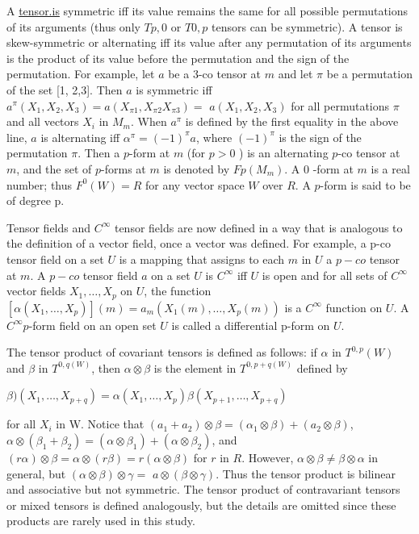 \documentclass[10pt]{article}
\begin{document}
A \href{http://tensor.is}{tensor.is} symmetric iff its value remains the same for all possible permutations of its arguments (thus only $T p, 0$ or $T 0, p$ tensors can be symmetric). A tensor is skew-symmetric or alternating iff its value after any permutation of its arguments is the product of its value before the permutation and the sign of the permutation. For example, let $a$ be a 3-co tensor at $m$ and let $\pi$ be a permutation of the set [1, 2,3]. Then $a$ is symmetric iff $a^{\pi}\left(X_{1}, X_{2}, X_{3}\right)=a\left(X_{\pi 1}, X_{\pi 2} X_{\pi 3}\right)=$ $a\left(X_{1}, X_{2}, X_{3}\right)$ for all permutations $\pi$ and all vectors $X_{i}$ in $M_{m}$. When $a^{\pi}$ is defined by the first equality in the above line, $a$ is alternating iff $\alpha^{\pi}=(-1)^{\pi} a$, where $(-1)^{\pi}$ is the sign of the permutation $\pi .$ Then a $p$-form at $m$ (for $p>0$ ) is an alternating $p$-co tensor at $m$, and the set of $p$-forms at $m$ is denoted by $F p\left(M_{m}\right)$. A 0 -form at $m$ is a real number; thus $F^{0}(W)=R$ for any vector space $W$ over $R$. A $p$-form is said to be of degree p.

Tensor fields and $C^{\infty}$ tensor fields are now defined in a way that is analogous to the definition of a vector field, once a vector was defined. For example, a p-co tensor field on a set $U$ is a mapping that assigns to each $m$ in $U$ a $p-c o$ tensor at $m .$ A $p-c o$ tensor field $a$ on a set $U$ is $C^{\infty}$ iff $U$ is open and for all sets of $C^{\infty}$ vector fields $X_{1}, \ldots, X_{p}$ on $U$, the function $\left[\alpha\left(X_{1}, \ldots, X_{p}\right)\right](m)=a_{m}\left(X_{1}(m), \ldots, X_{p}(m)\right)$ is a $C^{\infty}$ function on $U .$ A $C^{\infty} p$-form field on an open set $U$ is called a differential p-form on $U .$

The tensor product of covariant tensors is defined as follows: if $\alpha$ in $T^{0, p}(W)$ and $\beta$ in $T^{0, q(W)}$, then $\alpha \otimes \beta$ is the element in $T^{0, p+q(W)}$ defined by

$\beta)\left(X_{1}, \ldots, X_{p+q}\right)=\alpha\left(X_{1}, \ldots, X_{p}\right) \beta\left(X_{p+1}, \ldots, X_{p+q}\right)$

for all $X_{i}$ in W. Notice that $\left(a_{1}+a_{2}\right) \otimes \beta=\left(\alpha_{1} \otimes \beta\right)+\left(a_{2} \otimes \beta\right)$, $\alpha \otimes\left(\beta_{1}+\beta_{2}\right)=\left(\alpha \otimes \beta_{1}\right)+\left(\alpha \otimes \beta_{2}\right)$, and $(r \alpha) \otimes \beta=\alpha \otimes(r \beta)=r(\alpha \otimes \beta)$ for $r$ in $R$. However, $\alpha \otimes \beta \neq \beta \otimes \alpha$ in general, but $(\alpha \otimes \beta) \otimes \gamma=$ $a \otimes(\beta \otimes \gamma)$. Thus the tensor product is bilinear and associative but not symmetric. The tensor product of contravariant tensors or mixed tensors is defined analogously, but the details are omitted since these products are rarely used in this study.
\end{document}
